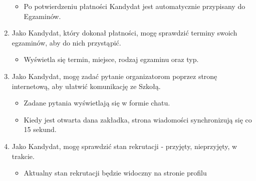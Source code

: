 \documentclass{article}
\begin{document}
\begin{enumerate}
\begin{itemize}
            \item Po potwierdzeniu płatności Kandydat jest automatycznie przypisany do Egzaminów.
        \end{itemize}
    \item Jako Kandydat, który dokonał płatności, mogę sprawdzić terminy swoich egzaminów, aby do nich przystąpić.
        \begin{itemize}
            \item Wyświetla się termin, miejsce, rodzaj egzaminu oraz typ.
        \end{itemize}
    \item Jako Kandydat, mogę zadać pytanie organizatorom poprzez stronę internetową, aby ułatwić komunikację ze Szkołą.
        \begin{itemize}
            \item Zadane pytania wyświetlają się w formie chatu.
            \item Kiedy jest otwarta dana zakładka, strona wiadomości synchronizują się co 15 sekund.
        \end{itemize}
    \item Jako Kandydat, mogę sprawdzić stan rekrutacji - przyjęty, nieprzyjęty, w trakcie.
        \begin{itemize}
            \item Aktualny stan rekrutacji będzie widoczny na stronie profilu
        \end{itemize}
\end{enumerate}
\end{document}
